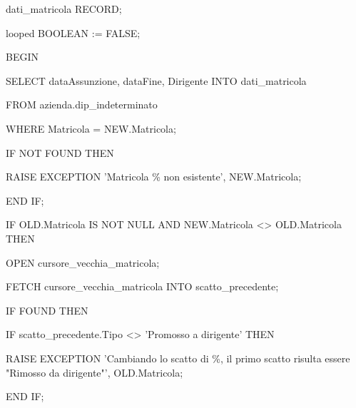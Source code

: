 \begin{flushleft}
\begin{description}
\begin{description}
                            \vspace{0.5cm}

                            \item dati\_matricola RECORD;
                            \item looped BOOLEAN := FALSE;
                        \end{description}
                    \item BEGIN 
                    \begin{description}
                        \item SELECT dataAssunzione, dataFine, Dirigente INTO dati\_matricola
                        \item FROM azienda.dip\_indeterminato
                        \item WHERE Matricola = NEW.Matricola;
                        
                        \vspace{0.5cm}
                        
                        \item  IF NOT FOUND THEN
                        \begin{description}
                            \item RAISE EXCEPTION 'Matricola \% non esistente', NEW.Matricola;
                        \end{description}
                        \item END IF;
                        
                        \item  IF OLD.Matricola IS NOT NULL AND NEW.Matricola <> OLD.Matricola THEN
                        \begin{description}
                            \item  OPEN cursore\_vecchia\_matricola;
                            \item FETCH cursore\_vecchia\_matricola INTO scatto\_precedente;

                            \item  IF FOUND THEN
                            \begin{description}

                                \item  IF scatto\_precedente.Tipo <> 'Promosso a dirigente' THEN
                                \begin{description}
                                    \item RAISE EXCEPTION 'Cambiando lo scatto di \%, il primo scatto risulta essere "Rimosso da dirigente"', OLD.Matricola;
                                \end{description}
                                \item END IF;
                                

\end{description}
\end{description}
\end{description}
\end{description}
\end{flushleft}
